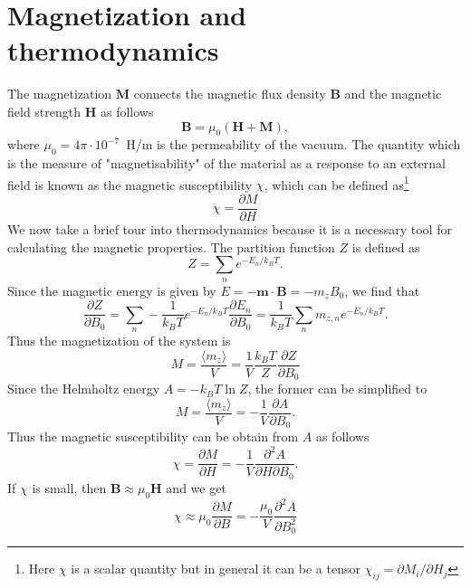 \section{Magnetization and thermodynamics}
The magnetization $\mathbf{M}$ connects the magnetic flux density $\mathbf{B}$ and the magnetic field strength $\mathbf{H}$ as follows
\begin{equation}
\mathbf{B}= \mu_0(\mathbf{H}+\mathbf{M}),
\end{equation}
where $\mu_0 = 4\pi \cdot 10^{-7}$~H/m is the permeability of the vacuum. The quantity which is the measure of "magnetisability" of the material as a response to an external field is known as the magnetic susceptibility $\chi$, which can be defined as\footnote{Here $\chi$ is a scalar quantity but in general it can be a tensor $\chi_{ij} = \partial M_i/\partial H_j$}
\begin{equation}
\chi = \frac{\partial M}{\partial H}
\end{equation}
We now take a brief tour into thermodynamics because it is a necessary tool for calculating the magnetic properties. The partition function $Z$ is defined as
\begin{equation}
Z =  \sum_{n} e^{-E_n/k_B T}.
\end{equation} 
Since the magnetic energy is given by $E=-\mathbf{m}\cdot\mathbf{B}=-m_zB_0$, we find that
\begin{equation}
\frac{\partial Z}{\partial B_0} = \sum_{n} -\frac{1}{k_B T} e^{-E_n/k_B T} \frac{\partial E_n}{\partial B_0} =  \frac{1}{k_B T} \sum_{n} m_{z,n} e^{-E_n/k_B T}.
\end{equation}
Thus the magnetization of the system is
\begin{equation}
M = \frac{\langle m_z\rangle}{V} = \frac{1}{V}\frac{k_B T}{Z} \frac{\partial Z}{\partial B_0}
\end{equation}
Since the Helmholtz energy $A = - k_B T \ln Z$, the former can be simplified
to
\begin{equation}
M = \frac{\langle m_z\rangle}{V} = - \frac{1}{V} \frac{\partial A}{\partial B_0}.
\end{equation}
Thus the magnetic susceptibility can be obtain from $A$ as follows
\begin{equation}
\chi = \frac{\partial M}{\partial H} =  - \frac{1}{V} \frac{\partial^2 A}{\partial H \partial B_0}.
\end{equation}
If $\chi$ is small, then $\mathbf{B} \approx \mu_0 \mathbf{H}$ and we get
\begin{equation}
\chi \approx \mu_0 \frac{\partial M}{\partial B} =  - \frac{\mu_0}{V} \frac{\partial^2 A}{\partial B_0^2}
\end{equation}

